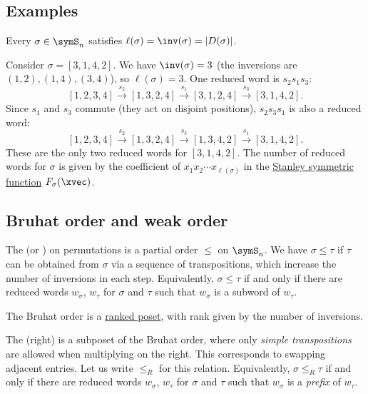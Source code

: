 \subsection[reducedWordExamples]{Examples}

Every $\sigma \in \symS_n$ satisfies $\ell(\sigma) = \inv(\sigma) = |D(\sigma)|$.

\begin{example*}
Consider $\sigma = [3,1,4,2]$. We have $\inv(\sigma) = 3$
(the inversions are $(1,2), (1,4), (3,4)$), so $\ell(\sigma) = 3$.
One reduced word is $s_2 s_1 s_3$:
\[
[1,2,3,4] \xrightarrow{s_2} [1,3,2,4] \xrightarrow{s_1} [3,1,2,4] \xrightarrow{s_3} [3,1,4,2].
\]
Since $s_1$ and $s_3$ commute (they act on disjoint positions),
$s_2 s_3 s_1$ is also a reduced word:
\[
[1,2,3,4] \xrightarrow{s_2} [1,3,2,4] \xrightarrow{s_3} [1,3,4,2] \xrightarrow{s_1} [3,1,4,2].
\]
These are the only two reduced words for $[3,1,4,2]$.
The number of reduced words for $\sigma$ is given by the
coefficient of $x_1 x_2 \dotsm x_{\ell(\sigma)}$ in the
\hyperref[stanleySym]{Stanley symmetric function} $F_\sigma(\xvec)$.
\end{example*}


\subsection[bruhatOrder]{Bruhat order and weak order}\label{weakOrder}

The \label{bruhatOrderDefinition}
(or \label{strongOrderDefinition}) on
permutations is a partial order $\leq$ on $\symS_n$.
We have $\sigma \leq \tau$ if
$\tau$ can be obtained from $\sigma$ via a sequence of transpositions,
which increase the number of inversions in each step.
Equivalently, $\sigma \leq \tau$ if and only if
there are reduced words $w_\sigma$, $w_\tau$ for $\sigma$ and $\tau$
such that $w_\sigma$ is a subword of $w_\tau$.

The Bruhat order is a \hyperref[rankedPoset]{ranked poset}, with rank given
by the number of inversions.

The (right) \label{weakOrderDefinition} is a subposet of
the Bruhat order, where only \emph{simple transpositions} are allowed when
multiplying on the right.
This corresponds to swapping adjacent entries.
Let us write $\leq_R$ for this relation.
Equivalently, $\sigma \leq_R \tau$ if and only if
there are reduced words $w_\sigma$, $w_\tau$ for $\sigma$ and $\tau$
such that $w_\sigma$ is a \emph{prefix} of $w_\tau$.


